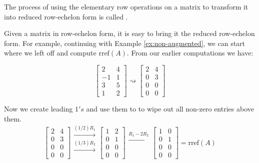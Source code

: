 \documentclass{ximera}
\begin{document}
\begin{definition}\label{def:GaussJordanElimination}
The process of using the elementary row operations on a matrix to transform it into reduced row-echelon form is called .
\end{definition}

Given a matrix in row-echelon form, it is easy to bring it the reduced row-echelon form.  For example, continuing with Example \ref{ex:non-augmented}, we can start where we left off and compute $\mbox{rref}(A)$.  From our earlier computations we have:

$$\begin{bmatrix}2&4\\-1&1\\3&5\\1&2\end{bmatrix}\rightsquigarrow\begin{bmatrix}2&4\\0&3\\0&0\\0&0\end{bmatrix}$$

Now we create leading $1's$ and use them to to wipe out all non-zero entries above them.
$$\begin{bmatrix}2&4\\0&3\\0&0\\0&0\end{bmatrix}
  \begin{array}{c}
    \xrightarrow{(1/2)R_1}\\
  \xrightarrow{(1/3)R_2}\\
  \\ 
  \\
 \end{array}
\begin{bmatrix}1&2\\0&1\\0&0\\0&0\end{bmatrix}
  \begin{array}{c}
  \xrightarrow{R_1-2R_2}\\
\\
\\
 \\
 \end{array}
\begin{bmatrix}1&0\\0&1\\0&0\\0&0\end{bmatrix}=\mbox{rref}(A)$$
\end{document}
